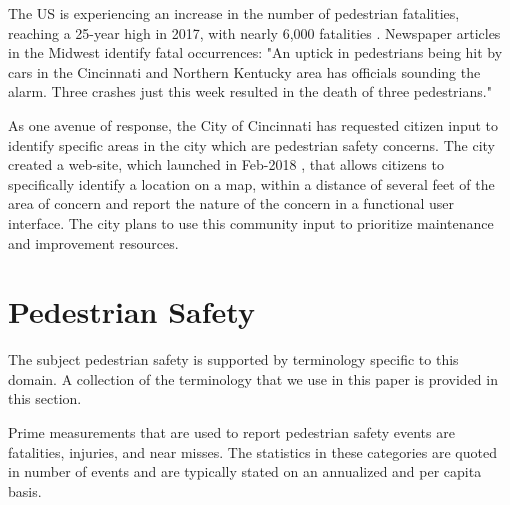 \documentclass{llncs}
\begin{document}
The US is experiencing an increase in the number of pedestrian fatalities, reaching a 25-year high in 2017, with nearly 6,000 fatalities \cite{domonoske2018pedestrian}. Newspaper articles in the Midwest identify fatal occurrences: \cite{kelley2018police} "An uptick in pedestrians being hit by cars in the Cincinnati and Northern Kentucky area has officials sounding the alarm. Three crashes just this week resulted in the death of three pedestrians."

As one avenue of response, the City of Cincinnati has requested citizen input to identify specific areas in the city which are pedestrian safety concerns. The city created a web-site, which launched in Feb-2018 \cite{cvg2018city}, that allows citizens to specifically identify a location on a map, within a distance of several feet of the area of concern and report the nature of the concern in a functional user interface. The city plans to use this community input to prioritize maintenance and improvement resources.

\section{Pedestrian Safety}
%
The subject pedestrian safety is supported by terminology specific to this domain. A collection of the terminology that we use in this paper is provided in this section. 

Prime measurements that are used to report pedestrian safety events are fatalities, injuries, and near misses. The statistics in these categories are quoted in number of events and are typically stated on an annualized and per capita basis.
\end{document}
